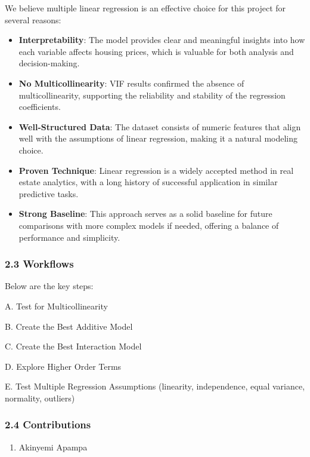 \documentclass[
]{article}
\providecommand{\tightlist}{%
  \setlength{\itemsep}{0pt}\setlength{\parskip}{0pt}}
\begin{document}
We believe multiple linear regression is an effective choice for this
project for several reasons:

\begin{itemize}
\item
  \textbf{Interpretability}: The model provides clear and meaningful
  insights into how each variable affects housing prices, which is
  valuable for both analysis and decision-making.
\item
  \textbf{No Multicollinearity}: VIF results confirmed the absence of
  multicollinearity, supporting the reliability and stability of the
  regression coefficients.
\item
  \textbf{Well-Structured Data}: The dataset consists of numeric
  features that align well with the assumptions of linear regression,
  making it a natural modeling choice.
\item
  \textbf{Proven Technique}: Linear regression is a widely accepted
  method in real estate analytics, with a long history of successful
  application in similar predictive tasks.
\item
  \textbf{Strong Baseline}: This approach serves as a solid baseline for
  future comparisons with more complex models if needed, offering a
  balance of performance and simplicity.
\end{itemize}

\subsubsection{2.3 Workflows}\label{workflows}

Below are the key steps:

A. Test for Multicollinearity

B. Create the Best Additive Model

C. Create the Best Interaction Model

D. Explore Higher Order Terms

E. Test Multiple Regression Assumptions (linearity, independence, equal
variance, normality, outliers)

\subsubsection{2.4 Contributions}\label{contributions}

\begin{enumerate}
\def\labelenumi{\arabic{enumi}.}
\tightlist
\item
  Akinyemi Apampa
\end{enumerate}
\end{document}
